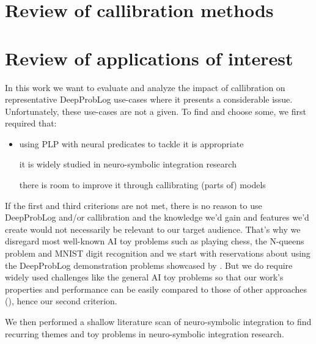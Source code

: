 \section{Review of callibration methods}
\section{Review of applications of interest}
In this work we want to evaluate and analyze the impact of callibration on representative DeepProbLog use-cases where it presents a considerable issue. Unfortunately, these use-cases are not a given. To find and choose some, we first required that:
\begin{itemize}
  \item{using PLP with neural predicates to tackle it is appropriate}
  \item[it is widely studied in neuro-symbolic integration research]
  \item[there is room to improve it through callibrating (parts of) models]
\end{itemize}
If the first and third criterions are not met, there is no reason to use DeepProbLog and/or callibration and the knowledge we'd gain and features we'd create would not necessarily be relevant to our target audience. That's why we disregard most well-known AI toy problems such as playing chess, the N-queens problem and MNIST digit recognition and we start with reservations about using the DeepProbLog demonstration problems showcased by \cite{manhaeve2018deepproblog}. But we do require widely used challenges like the general AI toy problems so that our work's properties and performance can be easily compared to those of other approaches (\cite{russell2002artificial}), hence our second criterion. \par
We then performed a shallow literature scan of neuro-symbolic integration to find recurring themes and toy problems in neuro-symbolic integration research.